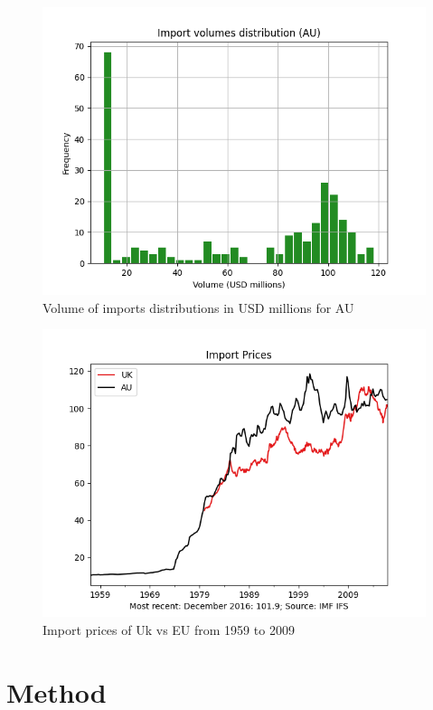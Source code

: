 \documentclass[a4paper, 12pt, english]{article}
\begin{document}
\begin{figure}
    \centering
    \includegraphics[scale = 0.7]{Figures/histo.png}
    \caption{Volume of imports distributions in USD millions for AU}
    \label{fig:histo1}
\end{figure}

\begin{figure}
    \centering
    \includegraphics[scale = 0.7]{Figures/plot.png}
    \caption{Import prices of Uk vs EU from 1959 to 2009 }
    \label{fig:plot}
\end{figure}

\newpage
\section{Method}
\blindtext[1]\\
\end{document}
